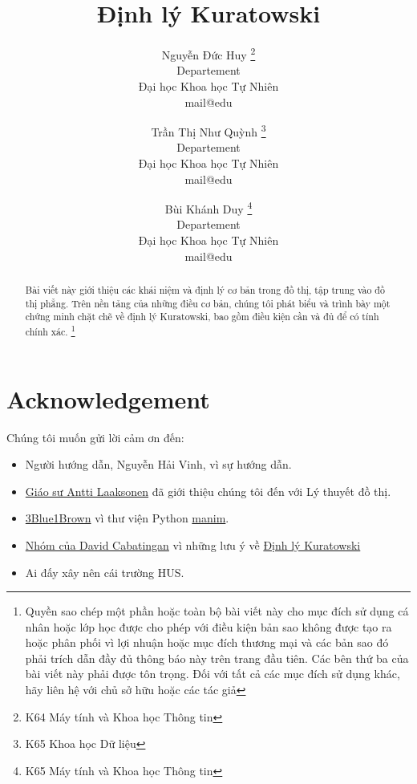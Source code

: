 \documentclass[12pt]{article}
\title{\textbf{Định lý Kuratowski}}
\author{
    Nguyễn Đức Huy \thanks{K64 Máy tính và Khoa học Thông tin}\\
    Departement \\
    Đại học Khoa học Tự Nhiên \\
    mail@edu
    \and
    Trần Thị Như Quỳnh \thanks{K65 Khoa học Dữ liệu} \\
    Departement \\
    Đại học Khoa học Tự Nhiên \\
    mail@edu
    \and
    Bùi Khánh Duy \thanks{K65 Máy tính và Khoa học Thông tin}\\
    Departement \\
    Đại học Khoa học Tự Nhiên \\
    mail@edu
}
\begin{document}
\begin{titlepage}
    \maketitle
    \begin{abstract}
        Bài viết này giới thiệu các khái niệm và định lý cơ bản trong đồ thị, tập trung vào đồ thị phẳng. Trên nền tảng của những điều cơ bản, chúng tôi phát biểu và trình bày một chứng minh chặt chẽ về định lý Kuratowski, bao gồm điều kiện cần và đủ để có tính chính xác. \footnote{Quyền sao chép một phần hoặc toàn bộ bài viết này cho mục đích sử dụng cá nhân hoặc lớp học được cho phép với điều kiện bản sao không được tạo ra hoặc phân phối vì lợi nhuận hoặc mục đích thương mại và các bản sao đó phải trích dẫn đầy đủ thông báo này trên trang đầu tiên. Các bên thứ ba của bài viết này phải được tôn trọng. Đối với tất cả các mục đích sử dụng khác, hãy liên hệ với chủ sở hữu hoặc các tác giả}
    \end{abstract}
\end{titlepage}

\begin{titlepage}
    \tableofcontents
\end{titlepage}







\section*{Acknowledgement}
Chúng tôi muốn gửi lời cảm ơn đến:
\begin{itemize}
    \item Người hướng dẫn, Nguyễn Hải Vinh, vì sự hướng dẫn.
    \item \href{https://cses.fi/book/book.pdf}{Giáo sư Antti Laaksonen} đã giới thiệu chúng tôi đến với Lý thuyết đồ thị.
    \item \href{https://www.youtube.com/channel/UCYO_jab_esuFRV4b17AJtAw}{3Blue1Brown} vì thư viện Python \href{https://github.com/dcabatin/manim}{manim}.
    \item \href{https://www.youtube.com/watch?v=DOnY6eZi2E8}{Nhóm của David Cabatingan} vì những lưu ý về \hyperref[thr:kuratowski]{Định lý Kuratowski}
    \item Ai đấy xây nên cái trường HUS.
\end{itemize}
\end{document}
